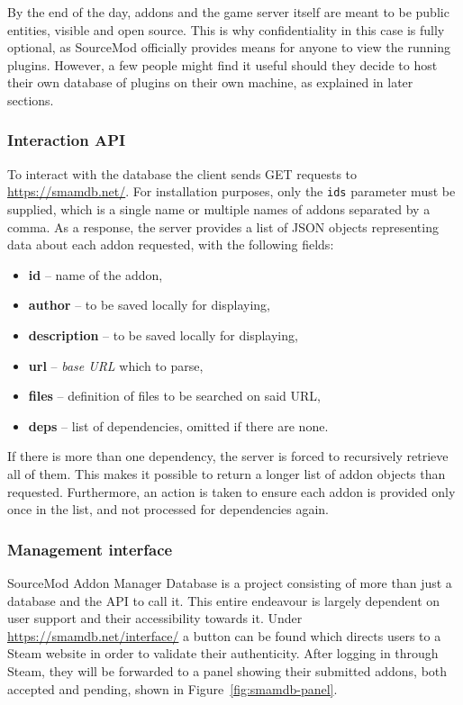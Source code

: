 By the end of the day, addons and the game server itself are meant to be public entities, visible and open source.
This is why confidentiality in this case is fully optional, as SourceMod officially provides means for anyone to view the running plugins.
However, a few people might find it useful should they decide to host their own database of plugins on their own machine, as explained in later sections.

\subsubsection{Interaction API}

To interact with the database the client sends GET requests to \url{https://smamdb.net/}.
For installation purposes, only the \verb|ids| parameter must be supplied, which is a single name or multiple names of addons separated by a comma.
As a response, the server provides a list of JSON objects representing data about each addon requested, with the following fields:
\begin{itemize}
    \item \textbf{id} -- name of the addon,
    \item \textbf{author} -- to be saved locally for displaying,
    \item \textbf{description} -- to be saved locally for displaying,
    \item \textbf{url} -- \textit{base URL} which to parse,
    \item \textbf{files} -- definition of files to be searched on said URL,
    \item \textbf{deps} -- list of dependencies, omitted if there are none.
\end{itemize}

If there is more than one dependency, the server is forced to recursively retrieve all of them.
This makes it possible to return a longer list of addon objects than requested.
Furthermore, an action is taken to ensure each addon is provided only once in the list, and not processed for dependencies again.

\subsubsection{Management interface}

SourceMod Addon Manager Database is a project consisting of more than just a database and the API to call it.
This entire endeavour is largely dependent on user support and their accessibility towards it.
Under \url{https://smamdb.net/interface/} a button can be found which directs users to a Steam website in order to validate their authenticity.
After logging in through Steam, they will be forwarded to a panel showing their submitted addons, both accepted and pending, shown in Figure~\ref{fig:smamdb-panel}.

